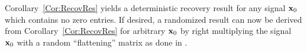 Corollary~\ref{Cor:RecovRes} yields a deterministic recovery result for any signal $\mathbf x_0$ which contains no zero entries.  If desired, a randomized result can now be derived from Corollary~\ref{Cor:RecovRes} for arbitrary $\mathbf x_0$ by right multiplying the signal $\mathbf x_0$ with a random ``flattening'' matrix as done in \cite{IVW2015_FastPhase}.
